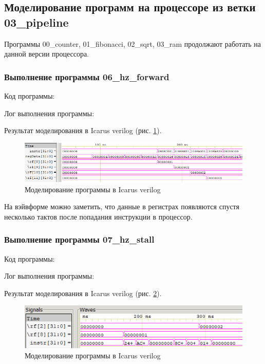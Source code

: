 \documentclass[a4paper,14pt]{article}
\begin{document}
	\subsection{Моделирование программ на процессоре из ветки 03\_pipeline}
	
	Программы 00\_counter, 01\_fibonacci, 02\_sqrt, 03\_ram продолжают работать на данной версии процессора.
	
	
	\subsubsection{Выполнение программы 06\_hz\_forward}
	
	Код программы:
	
	{\small {}}
	
	Лог выполнения программы:
	
	{\small {}}
	
	Результат моделирования в Icarus verilog (рис. \ref{fig:wvf06}).
	
	\begin{figure}[H]
		\centering
		\includegraphics[width=0.7\linewidth]{images/wvf_06}
		\caption{Моделирование программы в Icarus verilog}
		\label{fig:wvf06}
	\end{figure}

	На вэйвформе можно заметить, что данные в регистрах появляются спустя несколько тактов после попадания инструкции в процессор.
	
	
	\subsubsection{Выполнение программы 07\_hz\_stall}
	
	Код программы:
	
	{\small {}}
	
	Лог выполнения программы:
	
	{\small {}}
	
	Результат моделирования в Icarus verilog (рис. \ref{fig:wvf07}).
	
	\begin{figure}[H]
		\centering
		\includegraphics[width=0.7\linewidth]{images/wvf_07}
		\caption{Моделирование программы в Icarus verilog}
		\label{fig:wvf07}
	\end{figure}
\end{document}
